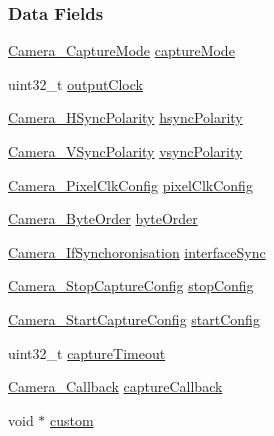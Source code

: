 \subsubsection*{Data Fields}
\begin{DoxyCompactItemize}
\item 
\hyperlink{_camera_8h_a74c8a8a13eebddea16c33c726d096ba8}{Camera\+\_\+\+Capture\+Mode} \hyperlink{struct_camera___params_ab370847eb029c1b816830f6a2fb1956f}{capture\+Mode}
\item 
uint32\+\_\+t \hyperlink{struct_camera___params_a0b8e5d861228a67c891ac7737c3546af}{output\+Clock}
\item 
\hyperlink{_camera_8h_a44b110de33cc32adba6d4a5807665987}{Camera\+\_\+\+H\+Sync\+Polarity} \hyperlink{struct_camera___params_a08f9574d65f148d071452c4ae0841d4b}{hsync\+Polarity}
\item 
\hyperlink{_camera_8h_a05347818dd7d8986a24a0fe1bc74d412}{Camera\+\_\+\+V\+Sync\+Polarity} \hyperlink{struct_camera___params_a707b9746ec88eb4d183a7471fd8151bf}{vsync\+Polarity}
\item 
\hyperlink{_camera_8h_a081a0e4af0b04d76a5476d22e6cf8657}{Camera\+\_\+\+Pixel\+Clk\+Config} \hyperlink{struct_camera___params_a55279b026ec9bee61c7f3fedef456d64}{pixel\+Clk\+Config}
\item 
\hyperlink{_camera_8h_ae5c1282ca99dd27ba0faf0f16f6e9904}{Camera\+\_\+\+Byte\+Order} \hyperlink{struct_camera___params_ac23766c87406fdf6b9aca3a3b9b4e15c}{byte\+Order}
\item 
\hyperlink{_camera_8h_a741d469cc903899255a1d3e76fdce47b}{Camera\+\_\+\+If\+Synchoronisation} \hyperlink{struct_camera___params_ad32edd6c21bc9952deeb917034ca0f45}{interface\+Sync}
\item 
\hyperlink{_camera_8h_a783564f838bc718a5b56f114027f5185}{Camera\+\_\+\+Stop\+Capture\+Config} \hyperlink{struct_camera___params_a89b5c7168ff120da5fc7461fb71499aa}{stop\+Config}
\item 
\hyperlink{_camera_8h_a97037da7c87b817ddb71ec7100c69ca5}{Camera\+\_\+\+Start\+Capture\+Config} \hyperlink{struct_camera___params_aa754cc494ff462b01a7ed647742b15af}{start\+Config}
\item 
uint32\+\_\+t \hyperlink{struct_camera___params_a7a66a4013966579c58e2d02ad788d6ce}{capture\+Timeout}
\item 
\hyperlink{_camera_8h_ad70b3ced1706386d1a093a0bf659bd87}{Camera\+\_\+\+Callback} \hyperlink{struct_camera___params_a2bc1db1262e09919a7711301cd784fda}{capture\+Callback}
\item 
void $\ast$ \hyperlink{struct_camera___params_a35814b7c3aea7ecb153cbe05371cad27}{custom}
\end{DoxyCompactItemize}


